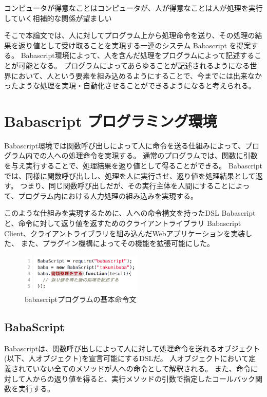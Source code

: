 コンピュータが得意なことはコンピュータが、人が得意なことは人が処理を実行していく相補的な関係が望ましい

そこで本論文では、人に対してプログラム上から処理命令を送り、その処理の結果を返り値として受け取ることを実現する一連のシステム
Babascript を提案する。
Babascript環境によって、人を含んだ処理をプログラムによって記述することが可能となる。
プログラムによってあらゆることが記述されるようになる世界において、人という要素を組み込めるようにすることで、今までには出来なかったような処理を実現・自動化させることができるようになると考えられる。

\section{Babascript
プログラミング環境}\label{babascript-ux30d7ux30edux30b0ux30e9ux30dfux30f3ux30b0ux74b0ux5883}

Babascript環境では関数呼び出しによって人に命令を送る仕組みによって、プログラム内での人への処理命令を実現する。
通常のプログラムでは、関数に引数を与え実行することで、処理結果を返り値として得ることができる。
Babascriptでは、同様に関数呼び出しし、処理を人に実行させ、返り値を処理結果として返す。
つまり、同じ関数呼び出しだが、その実行主体を人間にすることによって、プログラム内における人力処理の組み込みを実現する。

このような仕組みを実現するために、人への命令構文を持ったDSL Babascript
と、命令に対して返り値を返すためのクライアントライブラリ Babascript
Client、クライアントライブラリを組み込んだWebアプリケーションを実装した、
また、プラグイン機構によってその機能を拡張可能にした。

\begin{figure}[h]
  \centering
  \includegraphics[width=220px]{./images/script_01.png}
  \caption{babascriptプログラムの基本命令文}
  \label{script_01}
\end{figure}

\subsection{BabaScript}\label{babascript}

Babascriptは、関数呼び出しによって人に対して処理命令を送れるオブジェクト(以下、人オブジェクト)を宣言可能にするDSLだ。
人オブジェクトにおいて定義されていない全てのメソッドが人への命令として解釈される。
また、命令に対して人からの返り値を得ると、実行メソッドの引数で指定したコールバック関数を実行する。

